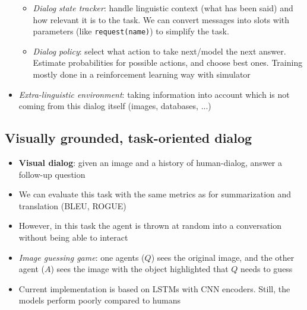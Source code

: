\begin{itemize}
	\begin{itemize}
		\item \textit{Dialog state tracker}: handle linguistic context (what has been said) and how relevant it is to the task. We can convert messages into slots with parameters (like \texttt{request(name)}) to simplify the task. 
		\item \textit{Dialog policy}: select what action to take next/model the next answer. Estimate probabilities for possible actions, and choose best ones. Training mostly done in a reinforcement learning way with simulator
	\end{itemize}
	\item \textit{Extra-linguistic environment}: taking information into account which is not coming from this dialog itself (images, databases, ...)
\end{itemize}
\subsection{Visually grounded, task-oriented dialog}
\begin{itemize}
	\item \textbf{Visual dialog}: given an image and a history of human-dialog, answer a follow-up question 
	\item We can evaluate this task with the same metrics as for summarization and translation (BLEU, ROGUE)
	\item However, in this task the agent is thrown at random into a conversation without being able to interact
	\item \textit{Image guessing game}: one agents ($Q$) sees the original image, and the other agent ($A$) sees the image with the object highlighted that $Q$ needs to guess
	\item Current implementation is based on LSTMs with CNN encoders. Still, the models perform poorly compared to humans
\end{itemize}